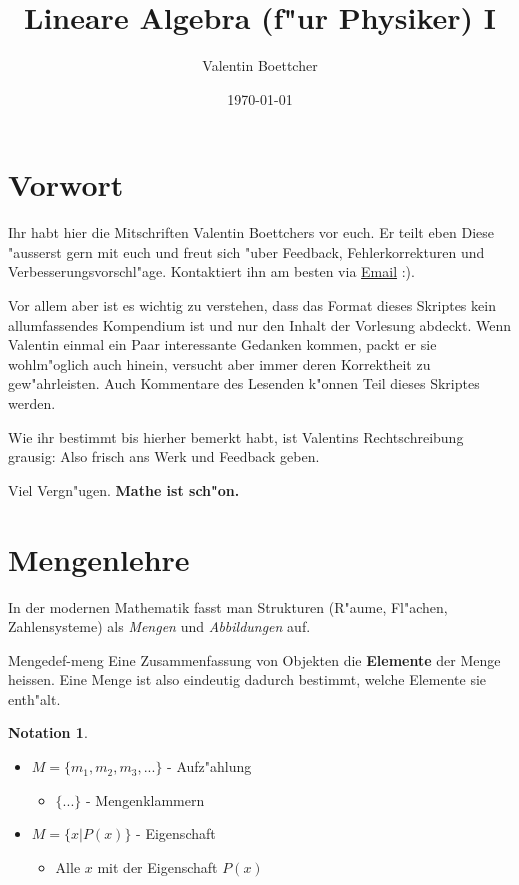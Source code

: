 \documentclass[11pt]{article}
\author{Valentin Boettcher}
\date{\today}
\title{Lineare Algebra (f"ur Physiker) I}
\theoremstyle{remark}
\theoremstyle{definition}
\newtheorem*{notation}{Notation}
\theoremstyle{remark}
\begin{document}
\maketitle
\tableofcontents

\maketitle
\newpage

\section{Vorwort}
\label{sec:org8d9fa1c}
Ihr habt hier die Mitschriften Valentin Boettchers vor euch. Er teilt eben Diese
"ausserst gern mit euch und freut sich "uber Feedback, Fehlerkorrekturen und
Verbesserungsvorschl"age. Kontaktiert ihn am besten via \href{mailto:valentin.boettcher@mailbox.tu-dresden.de}{Email} :).

Vor allem aber ist es wichtig zu verstehen, dass das Format dieses Skriptes
kein allumfassendes Kompendium ist und nur den Inhalt der Vorlesung abdeckt.
Wenn Valentin einmal ein Paar interessante Gedanken kommen, packt er sie
wohlm"oglich auch hinein, versucht aber immer deren Korrektheit zu
gew"ahrleisten. Auch Kommentare des Lesenden k"onnen Teil dieses Skriptes
werden.

Wie ihr bestimmt bis hierher bemerkt habt, ist Valentins Rechtschreibung
grausig: Also frisch ans Werk und Feedback geben.


Viel Vergn"ugen. \textbf{Mathe ist sch"on.}

\section{Mengenlehre}
\label{sec:orgd4be270}
In der modernen Mathematik fasst man Strukturen (R"aume, Fl"achen,
Zahlensysteme) als \emph{Mengen} und \emph{Abbildungen} auf.

\begin{definition}{Menge}{def-meng}
Eine Zusammenfassung von Objekten die \textbf{Elemente} der Menge heissen. Eine Menge ist
also eindeutig dadurch bestimmt, welche Elemente sie enth"alt.
\end{definition}

\begin{notation}\
\begin{itemize}
\item \(M=\{m_1,m_2,m_3,...\}\) - Aufz"ahlung
\begin{itemize}
\item \(\{...\}\) - Mengenklammern
\end{itemize}
\item \(M=\{x| P(x)\}\) - Eigenschaft
\begin{itemize}
\item Alle \(x\) mit der Eigenschaft \(P(x)\)
\end{itemize}
\end{itemize}
\end{notation}
\end{document}
